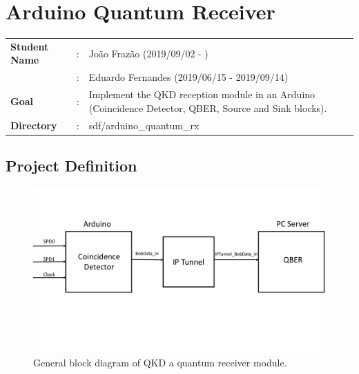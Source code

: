 \clearpage
\section{Arduino Quantum Receiver}

\begin{refsection}

\begin{tcolorbox}	
\begin{tabular}{p{2.75cm} p{0.2cm} p{10.5cm}} 	
\textbf{Student Name}  		&:&  Jo\~ao Fraz\~ao (2019/09/02 - )\\
							&:&  Eduardo Fernandes (2019/06/15 - 2019/09/14)\\
\textbf{Goal}          &:& Implement the QKD reception module in an Arduino (Coincidence Detector, QBER, Source and Sink blocks).\\
\textbf{Directory}              &:& sdf/arduino\_quantum\_rx
\end{tabular}
\end{tcolorbox}


\subsection{Project Definition}

\begin{figure}[H]
	\centering
	\includegraphics[width=1\linewidth]{./sdf/arduino_quantum_rx/figures/generalDiagram.pdf}
	\caption{General block diagram of QKD a quantum receiver module.}
	\label{fig:arduino}
\end{figure}


\end{refsection}

